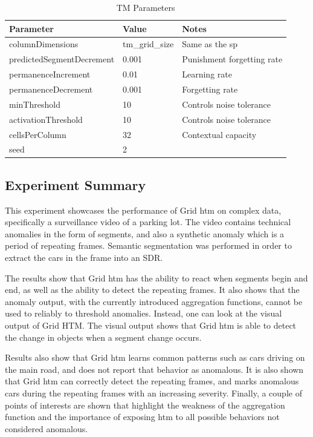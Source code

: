 \begin{table}[H]
    \centering
    \begin{tabularx}{\linewidth}{@{}XlX@{}}
        \toprule
        \textbf{Parameter}        & \textbf{Value} & \textbf{Notes}             \\
        \midrule
        columnDimensions          & tm\_grid\_size & Same as the \gls*{sp}      \\
        predictedSegmentDecrement & 0.001          & Punishment forgetting rate \\
        permanenceIncrement       & 0.01           & Learning rate              \\
        permanenceDecrement       & 0.001          & Forgetting rate            \\
        minThreshold              & 10             & Controls noise tolerance   \\
        activationThreshold       & 10             & Controls noise tolerance   \\
        cellsPerColumn            & 32             & Contextual capacity        \\
        seed                      & 2              &                            \\
        \bottomrule
    \end{tabularx}
    \caption{TM Parameters}
    \label{tab:surveillance_tm}
\end{table}
\subsection{Experiment Summary}
This experiment showcases the performance of Grid \gls*{htm} on complex data, specifically a surveillance video of a parking lot. The video contains technical anomalies in the form of segments, and also a synthetic anomaly which is a period of repeating frames. Semantic segmentation was performed in order to extract the cars in the frame into an SDR.
\par
The results show that Grid \gls*{htm} has the ability to react when segments begin and end, as well as the ability to detect the repeating frames. It also shows that the anomaly output, with the currently introduced aggregation functions, cannot be used to reliably to threshold anomalies. Instead, one can look at the visual output of Grid HTM. The visual output shows that Grid \gls*{htm} is able to detect the change in objects when a segment change occurs.
\par
Results also show that Grid \gls*{htm} learns common patterns such as cars driving on the main road, and does not report that behavior as anomalous. It is also shown that Grid \gls*{htm} can correctly detect the repeating frames, and marks anomalous cars during the repeating frames with an increasing severity. Finally, a couple of points of interests are shown that highlight the weakness of the aggregation function and the importance of exposing \gls*{htm} to all possible behaviors not considered anomalous.
\clearpage
